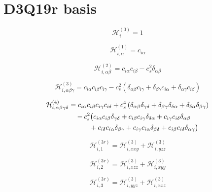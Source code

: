 \chapter{D3Q19r basis}
\label{appendix:D3Q19r}

\begin{equation}
    \mathcal{H}_i^{(0)} = 1
\end{equation}

\begin{equation}
    \mathcal{H}_{i,\alpha}^{(1)} = c_{i\alpha}
\end{equation}

\begin{equation}
    \mathcal{H}_{i,\alpha\beta}^{(2)} = c_{i\alpha}c_{i\beta} - c_s^2\delta_{\alpha\beta}
\end{equation}

\begin{equation}
    \mathcal{H}_{i,\alpha\beta\gamma}^{(3)} = c_{i\alpha}c_{i\beta}c_{i\gamma} - c_s^2(\delta_{\alpha\beta}c_{i\gamma} + \delta_{\beta\gamma}c_{i\alpha} + \delta_{\alpha\gamma}c_{i\beta}) 
\end{equation}

\begin{align}
\mathcal{H}_{i,\alpha\beta\gamma\delta}^{(4)} &= c_{i\alpha} c_{i\beta} c_{i\gamma} c_{i\delta} 
+ c_s^4 \left( \delta_{\alpha\beta} \delta_{\gamma\delta} 
+ \delta_{\beta\gamma} \delta_{\delta\alpha} 
+ \delta_{\delta\alpha} \delta_{\beta\gamma} \right) \notag \\
&\quad - c_s^2 \big( 
c_{i\alpha} c_{i\beta} \delta_{\gamma\delta} 
+ c_{i\beta} c_{i\gamma} \delta_{\delta\alpha} 
+ c_{i\gamma} c_{i\delta} \delta_{\alpha\beta} \notag \\
&\qquad\quad 
+ c_{i\delta} c_{i\alpha} \delta_{\beta\gamma} 
+ c_{i\gamma} c_{i\alpha} \delta_{\beta\delta} 
+ c_{i\beta} c_{i\delta} \delta_{\alpha\gamma} 
\big)
\end{align}


\begin{equation}
    \mathcal{H}_{i,1}^{(3r)} = \mathcal{H}_{i,xxy}^{(3)} + \mathcal{H}_{i,yzz}^{(3)} 
\end{equation}

\begin{equation}
    \mathcal{H}_{i,2}^{(3r)} = \mathcal{H}_{i,xzz}^{(3)} + \mathcal{H}_{i,xyy}^{(3)} 
\end{equation}

\begin{equation}
    \mathcal{H}_{i,3}^{(3r)} = \mathcal{H}_{i,yyz}^{(3)} + \mathcal{H}_{i,xxz}^{(3)}
\end{equation}

